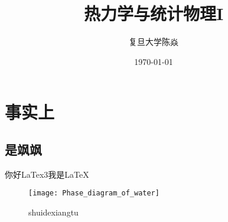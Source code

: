 \documentclass[UTF8]{ctexbook}
\title{
	\vspace{-4 cm}
	\bfseries
	热力学与统计物理I
}
\author{
	\CJKfamily{楷体}
	复旦大学\phantom{空格}陈焱
}
\date{
	\CJKfamily{楷体}
	\today
}
\numberwithin{equation}{section}
\theoremstyle{empty} %
\theoremstyle{empty} %
\theoremstyle{plain} %
\begin{document}
	\chapter{事实上}
	\section{是飒飒}
	你好LaTex3我是\LaTeX
	\begin{figure}[h]
		\texttt{[image: Phase\_diagram\_of\_water]}
		\caption{shuidexiangtu}
%		
	\end{figure}
\end{document}
